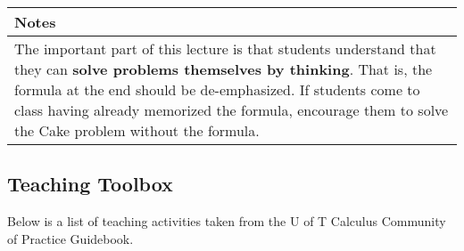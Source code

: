 \documentclass{book}
\begin{document}
		\begin{tabularx}{\textwidth}{|X|}
			\hline
			Notes\\
			\hline
				The important part of this lecture is that students understand that they can \textbf{solve problems
				themselves by thinking}. That is, the formula at the end should be de-emphasized. If students
				come to class having already memorized
				the formula, encourage them to solve the Cake problem without the formula.\\
			\hline
		\end{tabularx}

\newpage
\subsection*{Teaching Toolbox}
Below is a list of teaching activities taken from the U of T Calculus Community of Practice Guidebook.
\end{document}
